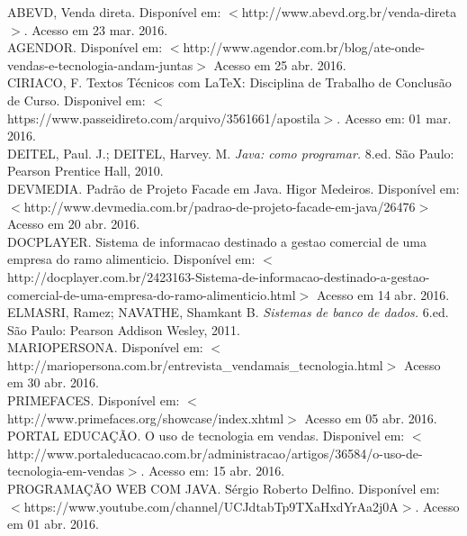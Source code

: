 \documentclass[chapter=TITLE,12pt,oneside,a4paper,english,french,sumario=tradicional,spanish,brazil,]{abntex2}
\begin{document}
\begin{thebibliography}{99}
\vspace{-0.5cm}
ABEVD, Venda direta. Disponível em: $<$http://www.abevd.org.br/venda-direta$>$. Acesso em  23 mar. 2016.
\\[0,4cm]

AGENDOR. Disponível em: $<$http://www.agendor.com.br/blog/ate-onde-vendas-e-tecnologia-andam-juntas$>$ Acesso em  25 abr. 2016.
\\[0,4cm]

CIRIACO, F. Textos Técnicos com LaTeX: Disciplina de Trabalho de Conclusão de Curso. Disponivel em: $<$https://www.passeidireto.com/arquivo/3561661/apostila$>$. Acesso em: 01 mar. 2016.
\\[0,4cm]

DEITEL, Paul. J.; DEITEL, Harvey. M. {\em Java: como programar.} 8.ed. São Paulo: Pearson Prentice Hall, 2010.
\\[0,4cm]

DEVMEDIA. Padrão de Projeto Facade em Java. Higor Medeiros. Disponível em: $<$http://www.devmedia.com.br/padrao-de-projeto-facade-em-java/26476$>$ Acesso em  20 abr. 2016.
\\[0,4cm]

DOCPLAYER. Sistema de informacao destinado a gestao comercial de uma empresa do ramo alimenticio. Disponível em: $<$http://docplayer.com.br/2423163-Sistema-de-informacao-destinado-a-gestao-comercial-de-uma-empresa-do-ramo-alimenticio.html$>$ Acesso em  14 abr. 2016.
\\[0,4cm]

ELMASRI, Ramez; NAVATHE, Shamkant B. {\em Sistemas de banco de dados.} 6.ed. São Paulo: Pearson Addison Wesley, 2011.
\\[0,4cm]

MARIOPERSONA. Disponível em: $<$http://mariopersona.com.br/entrevista\_vendamais\_tecnologia.html$>$ Acesso em  30 abr. 2016.
\\[0,4cm]

PRIMEFACES. Disponível em: $<$http://www.primefaces.org/showcase/index.xhtml$>$ Acesso em  05 abr. 2016.
\\[0,4cm]

PORTAL EDUCAÇÃO. {O uso de tecnologia em vendas}. Disponivel em: $<$http://www.portaleducacao.com.br/administracao/artigos/36584/o-uso-de-tecnologia-em-vendas$>$. Acesso em: 15 abr. 2016.
\\[0,4cm]

PROGRAMAÇÃO WEB COM JAVA. Sérgio Roberto Delfino. Disponível em: $<$https://www.youtube.com/channel/UCJdtabTp9TXaHxdYrAa2j0A$>$. Acesso em  01 abr. 2016.
\\[0,4cm]
\end{thebibliography}
\end{document}
